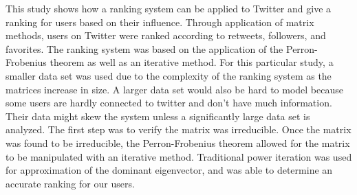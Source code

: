 This study shows how a ranking system can be applied to Twitter and give a ranking for users based on their influence. Through application of matrix methods, users on Twitter were ranked according to retweets, followers, and favorites. The ranking system was based on the application of the Perron-Frobenius theorem as well as an iterative method. For this particular study, a smaller data set was used due to the complexity of the ranking system as the matrices increase in size. A larger data set would also be hard to model because some users are hardly connected to twitter and don't have much information. Their data might skew the system unless a significantly large data set is analyzed. The first step was to verify the matrix was irreducible. Once the matrix was found to be irreducible, the Perron-Frobenius theorem allowed for the matrix to be manipulated with an iterative method. Traditional power iteration was used for approximation of the dominant eigenvector, and was able to determine an accurate ranking for our users.
